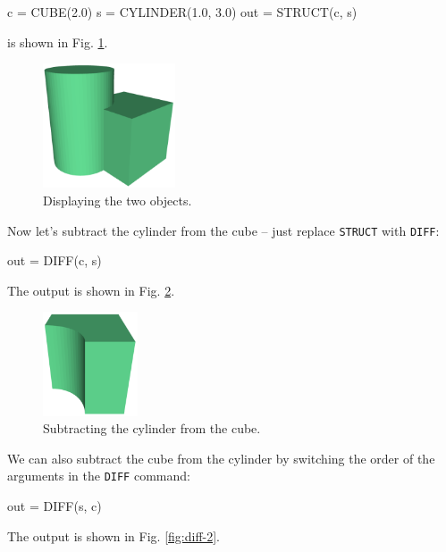 \begin{bluecode}
c = CUBE(2.0)
s = CYLINDER(1.0, 3.0)
out = STRUCT(c, s) 
\end{bluecode}
is shown in Fig. \ref{fig:diff-0}.
\newpage

\begin{figure}[!ht]
\begin{center}
\includegraphics[width=0.35\textwidth]{img/diff-0.png}
\end{center}
\vspace{-4mm}
\caption{Displaying the two objects.}
\label{fig:diff-0}
\end{figure}
\noindent
Now let's subtract the cylinder from the cube -- just replace 
{\tt STRUCT} with {\tt DIFF}:

\begin{bluecode}
out = DIFF(c, s) 
\end{bluecode}
The output is shown in Fig. \ref{fig:diff-1}.

\begin{figure}[!ht]
\begin{center}
\includegraphics[width=0.25\textwidth]{img/diff-1.png}
\end{center}
\vspace{-4mm}
\caption{Subtracting the cylinder from the cube.}
\label{fig:diff-1}
\end{figure}
\noindent
We can also subtract the cube from the cylinder by switching 
the order of the arguments in the {\tt DIFF} command:

\begin{bluecode}
out = DIFF(s, c) 
\end{bluecode}
The output is shown in Fig. \ref{fig:diff-2}.


